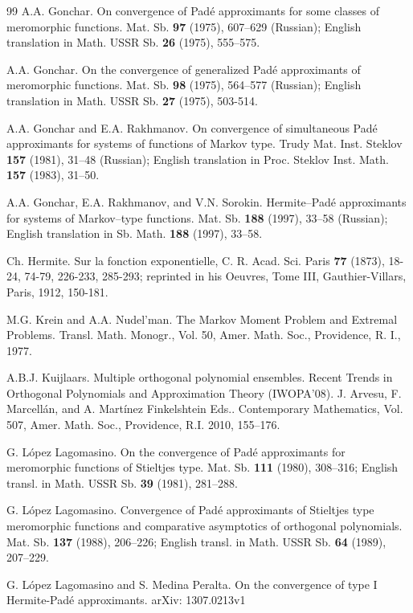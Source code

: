 \documentclass[10pt,a4paper]{article}
\theoremstyle{definition}
\theoremstyle{remark}
\numberwithin{equation}{section}
\begin{document}
\begin{thebibliography}{99}
 A.A. Gonchar. On convergence of Pad\'e approximants for some classes of meromorphic functions. Mat. Sb. {\bf 97} (1975), 607--629 (Russian); English translation in Math. USSR Sb. {\bf 26} (1975), 555--575.

 A.A. Gonchar. On the convergence of generalized Pad\'e approximants of meromorphic functions. Mat. Sb. {\bf 98} (1975), 564--577 (Russian); English translation in Math. USSR Sb. {\bf 27} (1975), 503-514.

 A.A. Gonchar and E.A. Rakhmanov. On convergence of simultaneous Pad\'e approximants for systems of functions of Markov type.  Trudy Mat. Inst. Steklov {\bf 157} (1981), 31--48 (Russian); English translation in Proc. Steklov Inst. Math. {\bf 157} (1983), 31--50.


 A.A. Gonchar, E.A. Rakhmanov, and V.N. Sorokin.   Hermite--Pad\'e approximants for systems of Markov--type functions. Mat. Sb. {\bf 188} (1997), 33--58 (Russian); English translation in Sb. Math. {\bf 188} (1997), 33--58.

  Ch. Hermite.  Sur la fonction exponentielle, C. R. Acad. Sci. Paris {\bf 77} (1873), 18-24, 74-79, 226-233, 285-293; reprinted in his Oeuvres, Tome III, Gauthier-Villars, Paris, 1912, 150-181.



  M.G. Krein and A.A. Nudel'man. The Markov Moment Problem and Extremal Problems. Transl. Math. Monogr., Vol. 50, Amer. Math. Soc., Providence, R. I., 1977.


 A.B.J. Kuijlaars. Multiple orthogonal polynomial ensembles. Recent Trends in Orthogonal Polynomials and Approximation Theory (IWOPA'08). J. Arvesu, F. Marcell\'an, and A. Mart\'inez Finkelshtein Eds.. Contemporary Mathematics, Vol. 507, Amer. Math. Soc., Providence, R.I. 2010, 155--176.


 G. L\'opez Lagomasino.  On the convergence of Pad\'e approximants for  meromorphic functions of Stieltjes type. Mat. Sb. {\bf 111} (1980), 308--316; English transl. in Math. USSR Sb. {\bf 39} (1981), 281--288.

 G. L\'opez Lagomasino.  Convergence of Pad\'e approximants of Stieltjes type meromorphic functions and comparative asymptotics of orthogonal polynomials. Mat. Sb. {\bf 137} (1988), 206--226; English transl. in Math. USSR Sb. {\bf 64} (1989), 207--229.


 G. L\'opez Lagomasino and S. Medina Peralta.  On the convergence of type I Hermite-Pad\'e approximants. arXiv: 1307.0213v1



\end{thebibliography}
\end{document}
